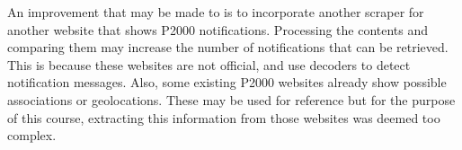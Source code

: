An improvement that may be made to is to incorporate another scraper for another website that shows P2000 notifications. Processing the contents and comparing them may increase the number of notifications that can be retrieved. This is because these websites are not official, and use decoders to detect notification messages. Also, some existing P2000 websites already show possible associations or geolocations. These may be used for reference but for the purpose of this course, extracting this information from those websites was deemed too complex.
